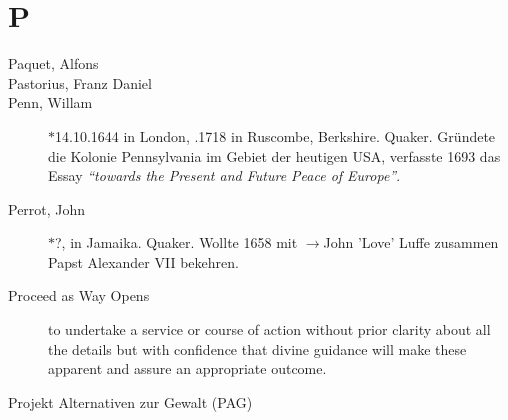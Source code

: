 \section*{P}

\articlesize

\begin{description}

 \item[Paquet, Alfons]

 \item[Pastorius, Franz Daniel]

 \item[Penn, Willam] $\ast$14.10.1644 in London, .1718 in Ruscombe, Berkshire. Quaker. Gründete die Kolonie Pennsylvania im Gebiet der heutigen USA, verfasste 1693 das Essay \textit{"`towards the Present and Future Peace of Europe"'}.

 \item[Perrot, John] $\ast$?,  in Jamaika. Quaker. Wollte 1658 mit $\to$John 'Love' Luffe zusammen Papst Alexander VII bekehren.

  \item[Proceed as Way Opens]
    to undertake a service or course of action without prior clarity about all the details but with confidence that divine guidance will make these apparent and assure an appropriate outcome.

 \item[Projekt Alternativen zur Gewalt (PAG)]

 \end{description}
\normalsize


